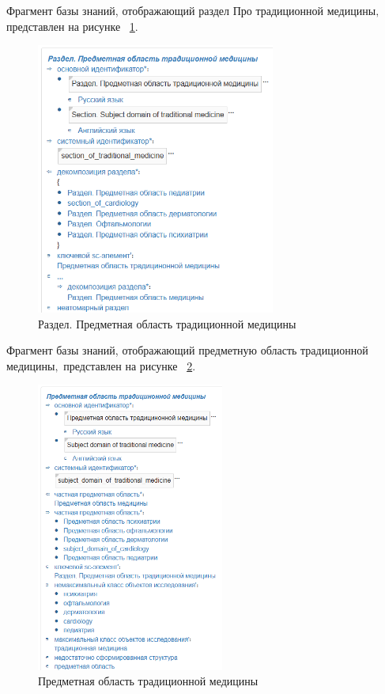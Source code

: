 Фрагмент базы знаний, отображающий  раздел Про традиционной медицины$,$ представлен на рисунке
~\ref{fig:sections/section_of_traditional_medicine}.
\begin{figure}[H]
	\centering
	\includegraphics[width=0.7\textwidth]{sections/section_of_traditional_medicine.png}
	\caption{Раздел. Предметная область традиционной медицины}
	\label{fig:sections/section_of_traditional_medicine}
\end{figure}
Фрагмент базы знаний, отображающий предметную область традиционной медицины$,$ представлен на рисунке
~\ref{fig:sections/subject_domain_of_traditional_medicine}.
\begin{figure}[H]
	\centering
	\includegraphics[width=0.55\textwidth]{sections/subject_domain_of_traditional_medicine.png}
	\caption{Предметная область традиционной медицины}
	\label{fig:sections/subject_domain_of_traditional_medicine}
\end{figure}


